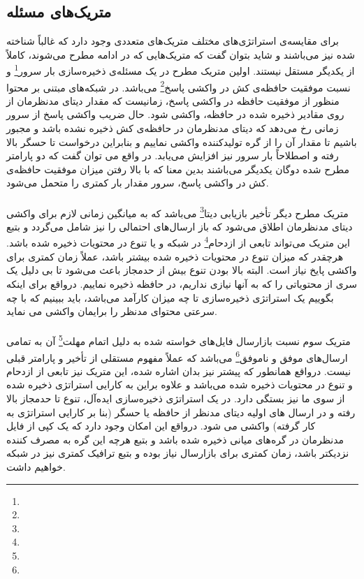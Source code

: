 \subsection{متریک‌های مسئله}
برای مقایسه‌ی استراتژی‌های مختلف متریک‌های متعددی وجود دارد که غالباً شناخته شده نیز می‌باشند و شاید بتوان گفت که متریک‌هایی که در ادامه مطرح می‌شوند، کاملاً از یکدیگر مستقل نیستند. اولین متریک مطرح در یک مسئله‌ی ذخیره‌سازی بار سرور\footnote{} و نسبت موفقیت حافظه‌ی کش در واکشی پاسخ\footnote{} می‌باشد. در شبکه‌های مبتنی بر محتوا منظور از موفقیت حافظه در واکشی پاسخ، زمانیست که مقدار دیتای مدنظرمان از روی مقادیر ذخیره شده در حافظه، واکشی شود. حال ضریب واکشی پاسخ از سرور زمانی رخ می‌دهد که دیتای مدنظرمان در حافظه‌ی کش ذخیره نشده باشد و مجبور باشیم تا مقدار آن را از گره تولیدکننده واکشی نماییم و بنابراین درخواست تا حسگر بالا رفته و اصطلاحاً بار سرور نیز افزایش می‌یابد. در واقع می توان گفت که دو پارامتر مطرح شده دوگان یکدیگر می‌باشند بدین معنا که با بالا رفتن میزان موفقیت حافظه‌ی کش در واکشی پاسخ، سرور مقدار بار کمتری را متحمل می‌شود.

\paragraph{}
متریک مطرح دیگر تأخیر بازیابی دیتا\footnote{} می‌باشد که به میانگین زمانی لازم برای واکشی دیتای مدنظرمان اطلاق می‌شود که باز ارسال‌های احتمالی را نیز شامل می‌گردد و بتبع این متریک می‌تواند تابعی از ازدحام\footnote{} در شبکه و یا تنوع در محتویات ذخیره شده باشد. هرچقدر که میزان تنوع در محتویات ذخیره شده بیشتر باشد، عملاً زمان کمتری برای واکشی پایخ نیاز است. البته بالا بودن تنوع بیش از حدمجاز باعث می‌شود تا بی دلیل یک سری از محتویاتی را که به آنها نیازی نداریم، در حافظه ذخیره نماییم. درواقع برای اینکه بگوییم یک استراتژی ذخیره‌سازی تا چه میزان کارآمد می‌باشد، باید ببینیم که با چه سرعتی محتوای مدنظر را برایمان واکشی می نماید.  

\paragraph{}
متریک سوم نسبت بازارسال فایل‌های خواسته شده به دلیل اتمام مهلت\footnote{} آن به تمامی ارسال‌های موفق و ناموفق\footnote{} می‌باشد که عملاً مفهوم مستقلی از تأخیر و پارامتر قبلی نیست. درواقع همانطور که پیشتر نیز بدان اشاره شده، این متریک نیز تابعی از ازدحام و تنوع در محتویات ذخیره شده می‌باشد و علاوه براین به کارایی استراتژی ذخیره شده از سوی ما نیز بستگی دارد. در یک استراتژی ذخیره‌سازی ایده‌آل، تنوع تا حدمجاز بالا رفته و در ارسال های اولیه دیتای مدنظر از حافظه یا حسگر (بنا بر کارایی استراتژی به کار گرفته) واکشی می شود. درواقع این امکان وجود دارد که یک کپی از فایل مدنظرمان در گره‌های میانی ذخیره شده باشد و بتبع هرچه این گره به مصرف کننده نزدیکتر باشد، زمان کمتری برای بازارسال نیاز بوده و بتبع ترافیک کمتری نیز در شبکه خواهیم داشت. 

